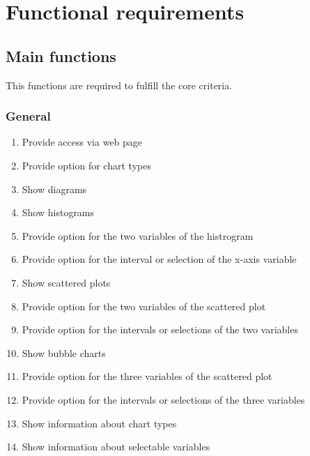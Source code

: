 \section{Functional requirements}


\renewcommand{\theenumi}{/F\arabic{enumi}0/}
\renewcommand{\labelenumi}{\theenumi}

  
\subsection{Main functions}

This functions are required to fulfill the core criteria.
 
\subsubsection*{General}
\begin{enumerate}
  \item Provide access via web page
    
  \item Provide option for chart types
  
  \item Show diagrams
  
  \item Show histograms %
  
  \item Provide option for the two variables of the histrogram
  
  \item Provide option for the interval or selection of the x-axis variable %
  
  \item Show scattered plots %
  
  \item Provide option for the two variables of the scattered plot
  
  \item Provide option for the intervals or selections of the two variables %
  
  \item Show bubble charts %
  
  \item Provide option for the three variables of the scattered plot
  
  \item Provide option for the intervals or selections of the three variables %
  
  \item Show information about chart types
  
  \item Show information about selectable variables
  
\end{enumerate}


